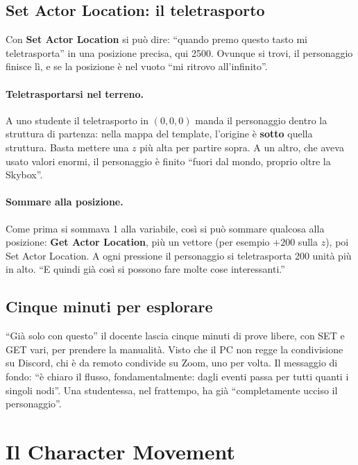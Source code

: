\subsection{Set Actor Location: il teletrasporto}

Con \textbf{Set Actor Location} si può dire: ``quando premo questo tasto mi
teletrasporta'' in una posizione precisa, qui 2500. Ovunque si trovi, il
personaggio finisce lì, e se la posizione è nel vuoto ``mi ritrovo
all'infinito''.

\paragraph{Teletrasportarsi nel terreno.} A uno studente il teletrasporto in
$(0, 0, 0)$ manda il personaggio dentro la struttura di partenza: nella mappa
del template, l'origine è \textbf{sotto} quella struttura. Basta mettere una
$z$ più alta per partire sopra. A un altro, che aveva usato valori enormi, il
personaggio è finito ``fuori dal mondo, proprio oltre la Skybox''.

\paragraph{Sommare alla posizione.} Come prima si sommava 1 alla variabile,
così si può sommare qualcosa alla posizione: \textbf{Get Actor Location},
più un vettore (per esempio $+200$ sulla $z$), poi Set Actor Location. A ogni
pressione il personaggio si teletrasporta 200 unità più in alto. ``E quindi già
così si possono fare molte cose interessanti.''

\subsection{Cinque minuti per esplorare}

``Già solo con questo'' il docente lascia cinque minuti di prove libere, con
SET e GET vari, per prendere la manualità. Visto che il PC non regge la
condivisione su Discord, chi è da remoto condivide su Zoom, uno per volta. Il
messaggio di fondo: ``è chiaro il flusso, fondamentalmente: dagli eventi passa
per tutti quanti i singoli nodi''. Una studentessa, nel frattempo, ha già
``completamente ucciso il personaggio''.

\section{Il Character Movement}
\label{gd7:sec:movement}

